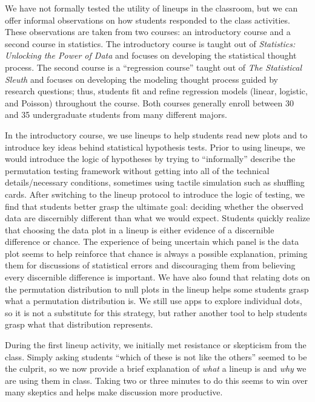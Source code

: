 \documentclass[12pt]{article}
\begin{document}
We have not formally tested the utility of lineups in the classroom, but
we can offer informal observations on how students responded to the
class activities. These observations are taken from two courses: an
introductory course and a second course in statistics. The introductory
course is taught out of \emph{Statistics: Unlocking the Power of Data}
\citep{Lock2017} and focuses on developing the statistical thought
process. The second course is a ``regression course'' taught out of
\emph{The Statistical Sleuth} \citep{ramsey2013} and focuses on
developing the modeling thought process guided by research questions;
thus, students fit and refine regression models (linear, logistic, and
Poisson) throughout the course. Both courses generally enroll between 30
and 35 undergraduate students from many different majors.

In the introductory course, we use lineups to help students read new
plots and to introduce key ideas behind statistical hypothesis tests.
Prior to using lineups, we would introduce the logic of hypotheses by
trying to ``informally'' describe the permutation testing framework
without getting into all of the technical details/necessary conditions,
sometimes using tactile simulation such as shuffling cards. After
switching to the lineup protocol to introduce the logic of testing, we
find that students better grasp the ultimate goal: deciding whether the
observed data are discernibly different than what we would expect.
Students quickly realize that choosing the data plot in a lineup is
either evidence of a discernible difference or chance. The experience of
being uncertain which panel is the data plot seems to help reinforce
that chance is always a possible explanation, priming them for
discussions of statistical errors and discouraging them from believing
every discernible difference is important. We have also found that
relating dots on the permutation distribution to null plots in the
lineup helps some students grasp what a permutation distribution is. We
still use apps to explore individual dots, so it is not a substitute for
this strategy, but rather another tool to help students grasp what that
distribution represents.

During the first lineup activity, we initially met resistance or
skepticism from the class. Simply asking students ``which of these is
not like the others'' seemed to be the culprit, so we now provide a
brief explanation of \emph{what} a lineup is and \emph{why} we are using
them in class. Taking two or three minutes to do this seems to win over
many skeptics and helps make discussion more productive.
\end{document}

